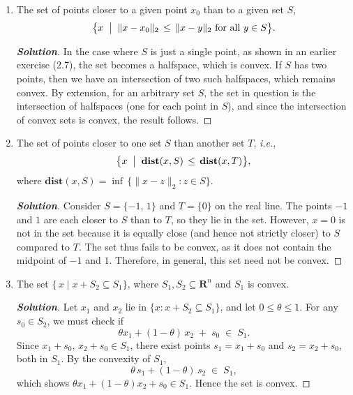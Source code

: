 \documentclass[12pt]{article}
\newenvironment{Solution}
  {\begin{proof}[\textbf{Solution}]}
  {\end{proof}}
\begin{document}
\begin{enumerate}[label=(\alph*)]
	\item
	      The set of points closer to a given point \(x_0\) than to a given set \(S\),
	      \[
		      \bigl\{
		      x \;\bigm|\;
		      \|x - x_0\|_2 \,\le\, \|x - y\|_2
		      \text{ for all }y \in S
		      \bigr\}.
	      \]
	      \begin{Solution}
		      In the case where \(S\) is just a single point, as shown in an earlier exercise (2.7), the set becomes a halfspace, which is convex. If \(S\) has two points, then we have an intersection of two such halfspaces, which remains convex. By extension, for an arbitrary set \(S\), the set in question is the intersection of halfspaces (one for each point in \(S\)), and since the intersection of convex sets is convex, the result follows.
	      \end{Solution}

	\item
	      The set of points closer to one set \(S\) than another set \(T\), \emph{i.e.},
	      \[
		      \bigl\{
		      x \;\bigm|\;
		      \mathbf{dist}(x,S)
		      \,\le\,
		      \mathbf{dist}(x,T)
		      \bigr\},
	      \]
	      where \(\mathbf{dist}(x,S) = \inf\,\{\|x-z\|_2 : z \in S\}\).
	      \begin{Solution}
		      Consider \(S = \{-1,\,1\}\) and \(T = \{0\}\) on the real line. The points \(-1\) and \(1\) are each closer to \(S\) than to \(T\), so they lie in the set. However, \(x=0\) is not in the set because it is equally close (and hence not strictly closer) to \(S\) compared to \(T\). The set thus fails to be convex, as it does not contain the midpoint of \(-1\) and \(1\). Therefore, in general, this set need not be convex.
	      \end{Solution}

	\item
	      The set \(\{\,x \mid x + S_2 \subseteq S_1\}\), where \(S_1,S_2 \subseteq \mathbf{R}^n\) and \(S_1\) is convex.
	      \begin{Solution}
		      Let \(x_1\) and \(x_2\) lie in \(\{x : x + S_2 \subseteq S_1\}\), and let \(0 \le \theta \le 1\). For any \(s_0 \in S_2\), we must check if
		      \[
			      \theta x_1 + (1-\theta)\,x_2 \;+\; s_0
			      \;\in\;
			      S_1.
		      \]
		      Since \(x_1 + s_0,\,x_2 + s_0 \in S_1\), there exist points
		      \(s_1 = x_1 + s_0\) and \(s_2 = x_2 + s_0\), both in \(S_1\). By the convexity of \(S_1\),
		      \[
			      \theta\,s_1 + (1-\theta)\,s_2 \;\in\; S_1,
		      \]
		      which shows \(\theta x_1 + (1-\theta)x_2 + s_0 \in S_1\). Hence the set is convex.
	      \end{Solution}


\end{enumerate}
\end{document}

